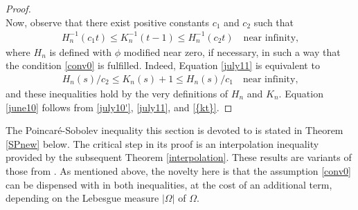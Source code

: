 \documentclass[leqno,11pt]{amsart}%
\numberwithin{equation}{section}
\theoremstyle{definition}
\numberwithin{equation}{section}
\begin{document}
\begin{proof}
\\ Now, observe that there exist positive constants $c_1$
and $c_2$ such that
\begin{align}
    \label{july11}
    H_n^{-1}(c_1t) \leq K_n^{-1}(t-1) \leq H_n^{-1}(c_2t) \quad \text{near infinity,}
\end{align}
where $H_n$ is defined with $\phi$ modified near zero, if necessary, in such a way that 
   the condition \eqref{conv0} is fulfilled. Indeed, Equation \eqref{july11}
   is equivalent to
   \begin{align}
    \label{july12'}
    H_n(s)/{c_2} \leq K_n(s) +1\leq H_n(s)/c_1 \quad \text{near infinity,}
\end{align}
and these inequalities hold by the very definitions of $H_n$ and $K_n$. 
Equation \eqref{june10} follows from \eqref{july10'}, \eqref{july11}, and \eqref{{kt}}. 
\end{proof}


The Poincar\'e-Sobolev inequality 
 this section is devoted to is stated in
Theorem \ref{SPnew} below. The critical step in its proof is an
interpolation 
inequality provided by the subsequent Theorem \ref{interpolation}.
These results 
 are variants of those from \cite{cianchi_CPDE}. As mentioned above, the novelty here is that the assumption \eqref{conv0}  can be dispensed with in both inequalities, at the cost of an additional term, depending on the Lebesgue measure $|\Omega|$ of $\Omega$.
\end{document}
